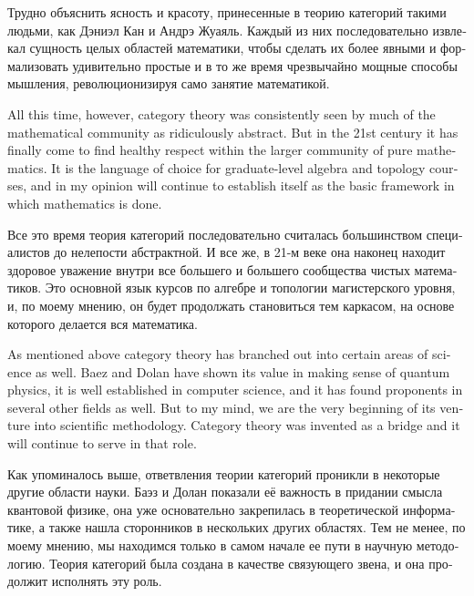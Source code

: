 \documentclass{book}
\theoremstyle{theoremENG}
\theoremstyle{lemmaENG}
\theoremstyle{propositionENG}
\theoremstyle{corollaryENG}
\theoremstyle{factENG}
\theoremstyle{remarkENG}
\theoremstyle{exampleENG}
\theoremstyle{warningENG}
\theoremstyle{questionENG}
\theoremstyle{guessENG}
\theoremstyle{answerENG}
\theoremstyle{constructionENG}
\theoremstyle{rulesENG}
\theoremstyle{excENG}
\theoremstyle{appENG}
\theoremstyle{definitionENG}
\theoremstyle{notationENG}
\theoremstyle{conjectureENG}
\theoremstyle{postulateENG}
\theoremstyle{theoremRUS}
\theoremstyle{lemmaRUS}
\theoremstyle{propositionRUS}
\theoremstyle{corollaryRUS}
\theoremstyle{factRUS}
\theoremstyle{remarkRUS}
\theoremstyle{exampleRUS}
\theoremstyle{warningRUS}
\theoremstyle{questionRUS}
\theoremstyle{guessRUS}
\theoremstyle{answerRUS}
\theoremstyle{constructionRUS}
\theoremstyle{rulesRUS}
\theoremstyle{excRUS}
\theoremstyle{appRUS}
\theoremstyle{definitionRUS}
\theoremstyle{notationRUS}
\theoremstyle{conjectureRUS}
\theoremstyle{postulateRUS}
\begin{document}
\begin{english}
\begin{russian}Трудно объяснить ясность и красоту, принесенные в теорию категорий такими людьми, как Дэниэл Кан и Андрэ Жуаяль. Каждый из них последовательно извлекал сущность целых областей математики, чтобы сделать их более явными и формализовать удивительно простые и в то же время чрезвычайно мощные способы мышления, революционизируя само занятие математикой. \end{russian}

All this time, however, category theory was consistently seen by much of the mathematical community as ridiculously abstract. But in the 21st century it has finally come to find healthy respect within the larger community of pure mathematics. It is the language of choice for graduate-level algebra and topology courses, and in my opinion will continue to establish itself as the basic framework in which mathematics is done.

\begin{russian}Все это время теория категорий последовательно считалась большинством специалистов до нелепости абстрактной. И все же, в 21-м веке она наконец находит здоровое уважение внутри все большего и большего сообщества чистых математиков. Это основной язык курсов по алгебре и топологии магистерского уровня, и, по моему мнению, он будет продолжать становиться тем каркасом, на основе которого делается вся математика. \end{russian}

As mentioned above category theory has branched out into certain areas of science as well. Baez and Dolan have shown its value in making sense of quantum physics, it is well established in computer science, and it has found proponents in several other fields as well. But to my mind, we are the very beginning of its venture into scientific methodology. Category theory was invented as a bridge and it will continue to serve in that role.

\begin{russian}Как упоминалось выше, ответвления теории категорий проникли в некоторые другие области науки. Баэз и Долан показали её важность в придании смысла квантовой физике, она уже основательно закрепилась в теоретической информатике, а также нашла сторонников в нескольких других областях. Тем не менее, по моему мнению, мы находимся только в самом начале ее пути в научную методологию. Теория категорий была создана в качестве связующего звена, и она продолжит исполнять эту роль. \end{russian}


\end{english}
\end{document}
